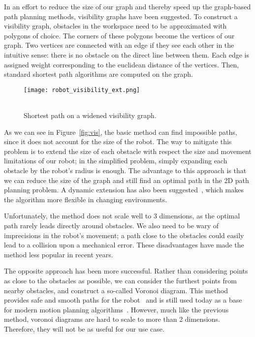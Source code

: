 In an effort to reduce the size of our graph and thereby speed up the graph-based path planning methods, visibility graphs have been suggested. To construct a visibility graph, obstacles in the workspace need to be approximated with polygons of choice. The corners of these polygons become the vertices of our graph. Two vertices are connected with an edge if they see each other in the intuitive sense: there is no obstacle on the direct line between them. Each edge is assigned weight corresponding to the euclidean distance of the vertices. Then, standard shortest path algorithms are computed on the graph.

\begin{wrapfigure}{l}{0.33\textwidth}
    \centering
    \texttt{[image: robot\_visibility\_ext.png]}
  \caption{\\Shortest path on a widened visibility graph.}\label{fig:vis_ext}
\end{wrapfigure}

As we can see in Figure~\ref{fig:vis}, the basic method can find impossible paths, since it does not account for the size of the robot. The way to mitigate this problem is to extend the size of each obstacle with respect the size and movement limitations of our robot; in the simplified problem, simply expanding each obstacle by the robot's radius is enough. The advantage to this approach is that we can reduce the size of the graph and still find an optimal path in the 2D path planning problem. A dynamic extension has also been suggested~\cite{DVG}, which makes the algorithm more flexible in changing environments.

Unfortunately, the method does not scale well to 3 dimensions, as the optimal path rarely leads directly around obstacles. We also need to be wary of imprecisions in the robot's movement; a path close to the obstacles could easily lead to a collision upon a mechanical error. These disadvantages have made the method less popular in recent years.

The opposite approach has been more successful. Rather than considering points as close to the obstacles as possible, we can consider the furthest points from nearby obstacles, and construct a so-called Voronoi diagram. This method provides safe and smooth paths for the robot~\cite{voronoi} and is still used today as a base for modern motion planning algorithms~\cite{voronoi2}. However, much like the previous method, voronoi diagrams are hard to scale to more than 2 dimensions. Therefore, they will not be as useful for our use case.

